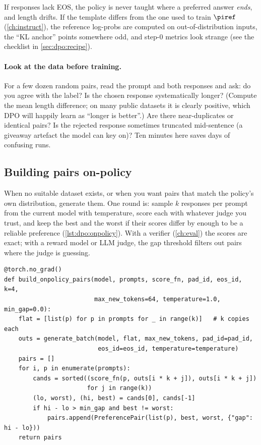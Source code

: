 \begin{pitfall}
If responses lack EOS, the policy is never taught where a preferred answer \emph{ends}, and
length drifts. If the template differs from the one used to train $\piref$ (\cref{ch:instruct}),
the reference log-probs are computed on out-of-distribution inputs, the ``KL anchor'' points
somewhere odd, and step-0 metrics look strange (see the checklist in \cref{sec:dpo:recipe}).
\end{pitfall}

\paragraph{Look at the data before training.} For a few dozen random pairs, read the prompt and
both responses and ask: do you agree with the label? Is the chosen response systematically
longer? (Compute the mean length difference; on many public datasets it is clearly positive,
which DPO will happily learn as ``longer is better''.) Are there near-duplicates or identical
pairs? Is the rejected response sometimes truncated mid-sentence (a giveaway artefact the model can
key on)? Ten minutes here saves days of confusing runs.

\subsection{Building pairs on-policy}\label{sec:dpo:onpolicy}

When no suitable dataset exists, or when you want pairs that match the policy's own
distribution, generate them. One round is: sample $k$ responses per prompt from the current model
with temperature, score each with whatever judge you trust, and keep the best and the worst if their
scores differ by enough to be a reliable preference (\cref{lst:dpo:onpolicy}). With a verifier
(\cref{ch:eval}) the scores are exact; with a reward model or LLM judge, the gap threshold filters
out pairs where the judge is guessing.

\begin{lstlisting}[caption={One round of on-policy pair construction (\ident{llmsys.prefopt.build_onpolicy_pairs}, abridged). Generation uses the batched, left-padded, KV-cached path from \cref{ch:serving}.},label={lst:dpo:onpolicy}]
@torch.no_grad()
def build_onpolicy_pairs(model, prompts, score_fn, pad_id, eos_id, k=4,
                         max_new_tokens=64, temperature=1.0, min_gap=0.0):
    flat = [list(p) for p in prompts for _ in range(k)]   # k copies each
    outs = generate_batch(model, flat, max_new_tokens, pad_id=pad_id,
                          eos_id=eos_id, temperature=temperature)
    pairs = []
    for i, p in enumerate(prompts):
        cands = sorted((score_fn(p, outs[i * k + j]), outs[i * k + j])
                       for j in range(k))
        (lo, worst), (hi, best) = cands[0], cands[-1]
        if hi - lo > min_gap and best != worst:
            pairs.append(PreferencePair(list(p), best, worst, {"gap": hi - lo}))
    return pairs
\end{lstlisting}

